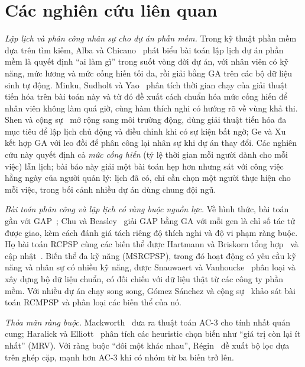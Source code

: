 \documentclass{IEEEtran}
\begin{document}
\section{Các nghiên cứu liên quan}
\label{sec:related}

\textit{Lập lịch và phân công nhân sự cho dự án phần mềm.} Trong kỹ thuật phần mềm dựa trên tìm kiếm, Alba và Chicano~\cite{alba2007} phát biểu bài toán lập lịch dự án phần mềm là quyết định ``ai làm gì'' trong suốt vòng đời dự án, với nhân viên có kỹ năng, mức lương và mức cống hiến tối đa, rồi giải bằng GA trên các bộ dữ liệu sinh tự động. Minku, Sudholt và Yao~\cite{minku2014} phân tích thời gian chạy của giải thuật tiến hóa trên bài toán này và từ đó đề xuất cách chuẩn hóa mức cống hiến để nhân viên không làm quá giờ, cùng hàm thích nghi có hướng rõ về vùng khả thi. Shen và cộng sự~\cite{shen2016} mở rộng sang môi trường động, dùng giải thuật tiến hóa đa mục tiêu để lập lịch chủ động và điều chỉnh khi có sự kiện bất ngờ; Ge và Xu~\cite{ge2016} kết hợp GA với leo đồi để phân công lại nhân sự khi dự án thay đổi. Các nghiên cứu này quyết định cả \emph{mức cống hiến} (tỷ lệ thời gian mỗi người dành cho mỗi việc) lẫn lịch; bài báo này giải một bài toán hẹp hơn nhưng sát với công việc hằng ngày của người quản lý: lịch đã có, chỉ cần chọn một người thực hiện cho mỗi việc, trong bối cảnh nhiều dự án dùng chung đội ngũ.

\textit{Bài toán phân công và lập lịch có ràng buộc nguồn lực.} Về hình thức, bài toán gần với GAP~\cite{ross1975}; Chu và Beasley~\cite{chu1997} giải GAP bằng GA với mỗi gen là chỉ số tác tử được giao, kèm cách đánh giá tách riêng độ thích nghi và độ vi phạm ràng buộc. Họ bài toán RCPSP cùng các biến thể được Hartmann và Briskorn tổng hợp~\cite{hartmann2010} và cập nhật~\cite{hartmann2022}. Biến thể đa kỹ năng (MSRCPSP), trong đó hoạt động có yêu cầu kỹ năng và nhân sự có nhiều kỹ năng, được Snauwaert và Vanhoucke~\cite{snauwaert2023} phân loại và xây dựng bộ dữ liệu chuẩn, có đối chiếu với dữ liệu thật từ các công ty phần mềm. Với nhiều dự án chạy song song, Gómez Sánchez và cộng sự~\cite{gomez2023} khảo sát bài toán RCMPSP và phân loại các biến thể của nó.

\textit{Thỏa mãn ràng buộc.} Mackworth~\cite{mackworth1977} đưa ra thuật toán AC-3 cho tính nhất quán cung; Haralick và Elliott~\cite{haralick1980} phân tích các heuristic chọn biến như ``giá trị còn lại ít nhất'' (MRV). Với ràng buộc ``đôi một khác nhau'', Régin~\cite{regin1994} đề xuất bộ lọc dựa trên ghép cặp, mạnh hơn AC-3 khi có nhóm từ ba biến trở lên.
\end{document}
